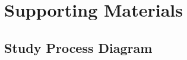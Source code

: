 \section{Supporting Materials}
\label{sec:supporingMaterials}

\subsection{Study Process Diagram}


